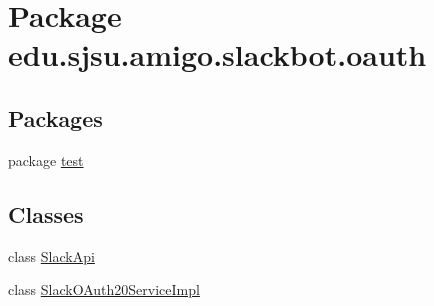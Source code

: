 \hypertarget{namespaceedu_1_1sjsu_1_1amigo_1_1slackbot_1_1oauth}{}\section{Package edu.\+sjsu.\+amigo.\+slackbot.\+oauth}
\label{namespaceedu_1_1sjsu_1_1amigo_1_1slackbot_1_1oauth}
\subsection*{Packages}
\begin{DoxyCompactItemize}
\item 
package \hyperlink{namespaceedu_1_1sjsu_1_1amigo_1_1slackbot_1_1oauth_1_1test}{test}
\end{DoxyCompactItemize}
\subsection*{Classes}
\begin{DoxyCompactItemize}
\item 
class \hyperlink{classedu_1_1sjsu_1_1amigo_1_1slackbot_1_1oauth_1_1_slack_api}{Slack\+Api}
\item 
class \hyperlink{classedu_1_1sjsu_1_1amigo_1_1slackbot_1_1oauth_1_1_slack_o_auth20_service_impl}{Slack\+O\+Auth20\+Service\+Impl}
\end{DoxyCompactItemize}
